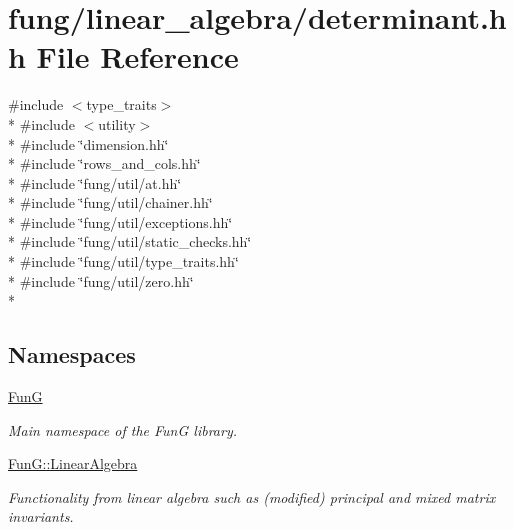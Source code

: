 \hypertarget{determinant_8hh}{}\section{fung/linear\+\_\+algebra/determinant.hh File Reference}
\label{determinant_8hh}
{\ttfamily \#include $<$type\+\_\+traits$>$}\\*
{\ttfamily \#include $<$utility$>$}\\*
{\ttfamily \#include \char`\"{}dimension.\+hh\char`\"{}}\\*
{\ttfamily \#include \char`\"{}rows\+\_\+and\+\_\+cols.\+hh\char`\"{}}\\*
{\ttfamily \#include \char`\"{}fung/util/at.\+hh\char`\"{}}\\*
{\ttfamily \#include \char`\"{}fung/util/chainer.\+hh\char`\"{}}\\*
{\ttfamily \#include \char`\"{}fung/util/exceptions.\+hh\char`\"{}}\\*
{\ttfamily \#include \char`\"{}fung/util/static\+\_\+checks.\+hh\char`\"{}}\\*
{\ttfamily \#include \char`\"{}fung/util/type\+\_\+traits.\+hh\char`\"{}}\\*
{\ttfamily \#include \char`\"{}fung/util/zero.\+hh\char`\"{}}\\*
\subsection*{Namespaces}
\begin{DoxyCompactItemize}
\item 
 \hyperlink{namespaceFunG}{FunG}
\begin{DoxyCompactList}\small\item\em Main namespace of the FunG library. \end{DoxyCompactList}\item 
 \hyperlink{namespaceFunG_1_1LinearAlgebra}{Fun\+G\+::\+Linear\+Algebra}
\begin{DoxyCompactList}\small\item\em Functionality from linear algebra such as (modified) principal and mixed matrix invariants. \end{DoxyCompactList}\end{DoxyCompactItemize}
